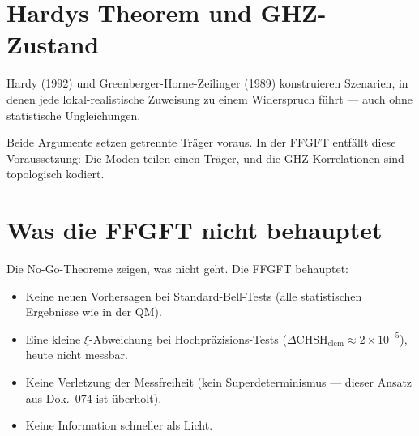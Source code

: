 \section{Hardys Theorem und GHZ-Zustand}

Hardy (1992) und Greenberger-Horne-Zeilinger (1989) konstruieren
Szenarien, in denen jede lokal-realistische Zuweisung zu einem
Widerspruch führt — auch ohne statistische Ungleichungen.

Beide Argumente setzen getrennte Träger voraus. In der FFGFT
entfällt diese Voraussetzung: Die Moden teilen einen Träger, und
die GHZ-Korrelationen sind topologisch kodiert.

\section{Was die FFGFT nicht behauptet}

Die No-Go-Theoreme zeigen, was nicht geht. Die FFGFT behauptet:
\begin{itemize}
  \item Keine neuen Vorhersagen bei Standard-Bell-Tests (alle
        statistischen Ergebnisse wie in der QM).
  \item Eine kleine $\xi$-Abweichung bei Hochpräzisions-Tests
        ($\Delta\mathrm{CHSH}_{\mathrm{elem}}\approx2\times10^{-5}$),
        heute nicht messbar.
  \item Keine Verletzung der Messfreiheit (kein Superdeterminismus
        — dieser Ansatz aus Dok.~074 ist überholt).
  \item Keine Information schneller als Licht.
\end{itemize}

